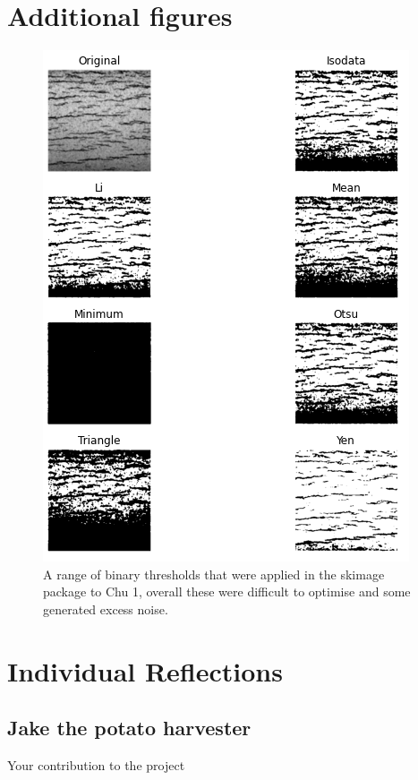 \documentclass{article}
\begin{document}
\newpage



\newpage
\appendix
\section{Additional figures}

\begin{figure}[h]
	    \centering
	    \includegraphics[scale=0.7]{Figures/skimage_thresholds.png}
	    \caption{A range of binary thresholds that were applied in the skimage package to Chu 1, overall these were difficult to optimise and some generated excess noise.}
	    \label{fig:skimage_threshold}
	\end{figure}
	
\section{Individual Reflections}
\subsection{Jake the potato harvester}
Your contribution to the project
\end{document}

